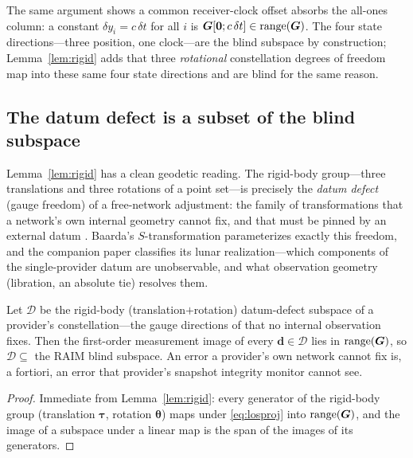 \begin{remark}
\label{rem:clock}
The same argument shows a common receiver-clock offset absorbs the all-ones column: a
constant $\delta y_i=c\,\delta t$ for all $i$ is $\bm{G}[\bm 0;c\,\delta t]\in\operatorname{range}(\bm{G})$.
The four state directions---three position, one clock---are the blind subspace by
construction; Lemma~\ref{lem:rigid} adds that three \emph{rotational} constellation
degrees of freedom map into these same four state directions and are blind for the same
reason.
\end{remark}

\subsection{The datum defect is a subset of the blind subspace}
\label{sec:datumtie}

Lemma~\ref{lem:rigid} has a clean geodetic reading. The rigid-body group---three
translations and three rotations of a point set---is precisely the \emph{datum defect}
(gauge freedom) of a free-network adjustment: the family of transformations that a
network's own internal geometry cannot fix, and that must be pinned by an external
datum \citep{baarda1973,teunissen2000}. Baarda's $S$-transformation parameterizes
exactly this freedom, and the companion paper \citep{baweja2026datum} classifies its
lunar realization---which components of the single-provider datum are unobservable, and
what observation geometry (libration, an absolute tie) resolves them.

\begin{corollary}
\label{cor:datum}
Let $\mathcal{D}$ be the rigid-body (translation$+$rotation) datum-defect subspace of a
provider's constellation---the gauge directions of \citep{baweja2026datum} that no
internal observation fixes. Then the first-order measurement image of every
$\bm d\in\mathcal{D}$ lies in $\operatorname{range}(\bm{G})$, so
$\mathcal{D}\subseteq$ the RAIM blind subspace. An error a provider's own network
cannot fix is, a fortiori, an error that provider's snapshot integrity monitor cannot
see.
\end{corollary}

\begin{proof}
Immediate from Lemma~\ref{lem:rigid}: every generator of the rigid-body group
(translation $\bm\tau$, rotation $\bm\theta$) maps under \eqref{eq:losproj} into
$\operatorname{range}(\bm{G})$, and the image of a subspace under a linear map is the span of the images
of its generators.
\end{proof}

